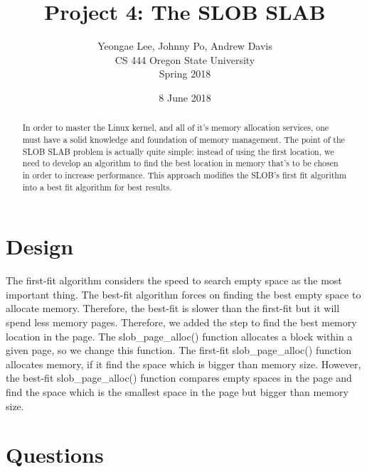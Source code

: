 \documentclass[onecolumn, draftclsnofoot,10pt, compsoc]{IEEEtran}
\title{Project 4: The SLOB SLAB}
\author{Yeongae Lee, Johnny Po, Andrew Davis\\CS 444 Oregon State University\\Spring 2018}
\date {8 June 2018}
\begin{document}
\begin{titlepage}
	\maketitle
    \begin{singlespace}
        \begin{abstract}
        In order to master the Linux kernel, and all of it's memory allocation services, one must have a solid knowledge and foundation of memory management. The point of the SLOB SLAB problem is actually quite simple: instead of using the first location, we need to develop an algorithm to find the best location in memory that's to be chosen in order to increase performance. This approach modifies the SLOB's first fit algorithm into a best fit algorithm for best results. 
		
        	
        \end{abstract}     
    \end{singlespace}
\end{titlepage}
\newpage

\section{Design}
The first-fit algorithm considers the speed to search empty space as the most important thing. The best-fit algorithm forces on finding the best empty space to allocate memory. Therefore, the best-fit is slower than the first-fit but it will spend less memory pages. Therefore, we added the step to find the best memory location in the page. The slob\_page\_alloc() function allocates a block within a given page, so we change this function. The first-fit slob\_page\_alloc() function allocates memory, if it find the space which is bigger than memory size. However, the best-fit slob\_page\_alloc() function compares empty spaces in the page and find the space which is the smallest space in the page but bigger than memory size.



\section{Questions}
\end{document}
